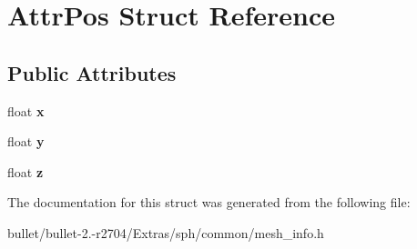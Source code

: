 \hypertarget{struct_attr_pos}{\section{Attr\+Pos Struct Reference}
\label{struct_attr_pos}
}
\subsection*{Public Attributes}
\begin{DoxyCompactItemize}
\item 
\hypertarget{struct_attr_pos_a766167d61cae9d27b33bb9e4cdf7b17f}{float {\bfseries x}}\label{struct_attr_pos_a766167d61cae9d27b33bb9e4cdf7b17f}

\item 
\hypertarget{struct_attr_pos_abc9593e2dab17f5caaeb38765a70827e}{float {\bfseries y}}\label{struct_attr_pos_abc9593e2dab17f5caaeb38765a70827e}

\item 
\hypertarget{struct_attr_pos_aef8fdb2b1fa8aa690031e6cbb5081929}{float {\bfseries z}}\label{struct_attr_pos_aef8fdb2b1fa8aa690031e6cbb5081929}

\end{DoxyCompactItemize}


The documentation for this struct was generated from the following file\+:\begin{DoxyCompactItemize}
\item 
bullet/bullet-\/2.-\/r2704/\+Extras/sph/common/mesh\+\_\+info.\+h\end{DoxyCompactItemize}
